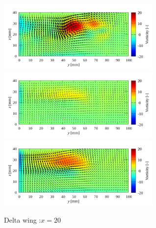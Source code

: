 \documentclass[twocolumn,a4j]{jsarticle}
\begin{document}
\newpage
\begin{figure}[htbp]
  \centering
  {
    \includegraphics[keepaspectratio, width=80mm]{../images/Simulation/Compare/experiment_x=20.png}
    \includegraphics[keepaspectratio, width=80mm]{../images/Simulation/Compare/simulation_x=20.png}
    \includegraphics[keepaspectratio, width=80mm]{../images/Simulation/Compare/simulation2_x=20.png}
  }
  \caption{Delta wing :$x=20$}
\end{figure}
\end{document}
